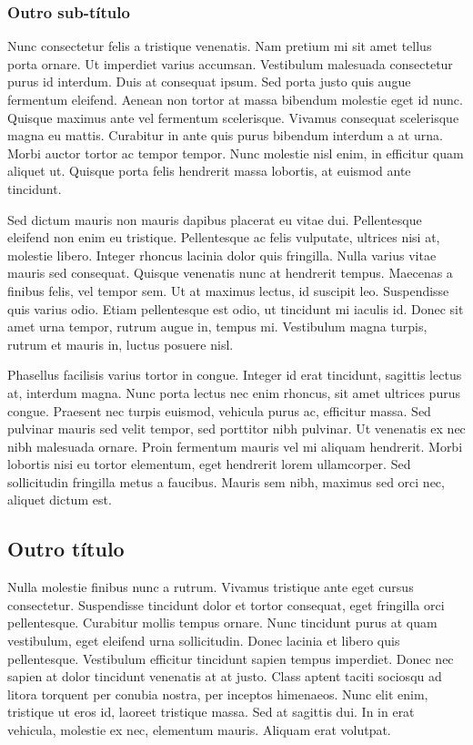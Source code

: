 \subsubsection{Outro sub-título}

Nunc consectetur felis a tristique venenatis. Nam pretium mi sit amet tellus porta ornare. Ut imperdiet varius accumsan. Vestibulum malesuada consectetur purus id interdum. Duis at consequat ipsum. Sed porta justo quis augue fermentum eleifend. Aenean non tortor at massa bibendum molestie eget id nunc. Quisque maximus ante vel fermentum scelerisque. Vivamus consequat scelerisque magna eu mattis. Curabitur in ante quis purus bibendum interdum a at urna. Morbi auctor tortor ac tempor tempor. Nunc molestie nisl enim, in efficitur quam aliquet ut. Quisque porta felis hendrerit massa lobortis, at euismod ante tincidunt.

Sed dictum mauris non mauris dapibus placerat eu vitae dui. Pellentesque eleifend non enim eu tristique. Pellentesque ac felis vulputate, ultrices nisi at, molestie libero. Integer rhoncus lacinia dolor quis fringilla. Nulla varius vitae mauris sed consequat. Quisque venenatis nunc at hendrerit tempus. Maecenas a finibus felis, vel tempor sem. Ut at maximus lectus, id suscipit leo. Suspendisse quis varius odio. Etiam pellentesque est odio, ut tincidunt mi iaculis id. Donec sit amet urna tempor, rutrum augue in, tempus mi. Vestibulum magna turpis, rutrum et mauris in, luctus posuere nisl.

Phasellus facilisis varius tortor in congue. Integer id erat tincidunt, sagittis lectus at, interdum magna. Nunc porta lectus nec enim rhoncus, sit amet ultrices purus congue. Praesent nec turpis euismod, vehicula purus ac, efficitur massa. Sed pulvinar mauris sed velit tempor, sed porttitor nibh pulvinar. Ut venenatis ex nec nibh malesuada ornare. Proin fermentum mauris vel mi aliquam hendrerit. Morbi lobortis nisi eu tortor elementum, eget hendrerit lorem ullamcorper. Sed sollicitudin fringilla metus a faucibus. Mauris sem nibh, maximus sed orci nec, aliquet dictum est.

\subsection{Outro título}

Nulla molestie finibus nunc a rutrum. Vivamus tristique ante eget cursus consectetur. Suspendisse tincidunt dolor et tortor consequat, eget fringilla orci pellentesque. Curabitur mollis tempus ornare. Nunc tincidunt purus at quam vestibulum, eget eleifend urna sollicitudin. Donec lacinia et libero quis pellentesque. Vestibulum efficitur tincidunt sapien tempus imperdiet. Donec nec sapien at dolor tincidunt venenatis at at justo. Class aptent taciti sociosqu ad litora torquent per conubia nostra, per inceptos himenaeos. Nunc elit enim, tristique ut eros id, laoreet tristique massa. Sed at sagittis dui. In in erat vehicula, molestie ex nec, elementum mauris. Aliquam erat volutpat.

